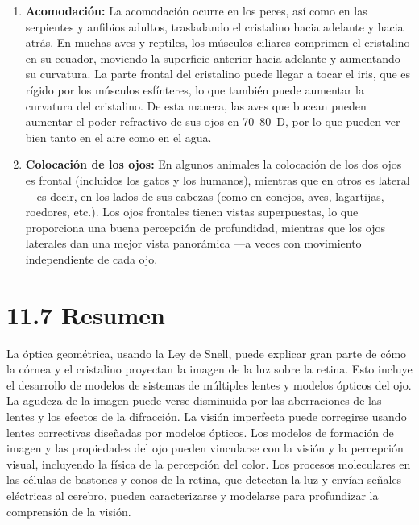 \documentclass[12pt]{book}
\begin{document}
\begin{enumerate}
  \item \textbf{Acomodación:} La acomodación ocurre en los peces, así como en las serpientes y anfibios adultos, trasladando el cristalino hacia adelante y hacia atrás. En muchas aves y reptiles, los músculos ciliares comprimen el cristalino en su ecuador, moviendo la superficie anterior hacia adelante y aumentando su curvatura. La parte frontal del cristalino puede llegar a tocar el iris, que es rígido por los músculos esfínteres, lo que también puede aumentar la curvatura del cristalino. De esta manera, las aves que bucean pueden aumentar el poder refractivo de sus ojos en 70--80~D, por lo que pueden ver bien tanto en el aire como en el agua.

  \item \textbf{Colocación de los ojos:} En algunos animales la colocación de los dos ojos es frontal (incluidos los gatos y los humanos), mientras que en otros es lateral ---es decir, en los lados de sus cabezas (como en conejos, aves, lagartijas, roedores, etc.). Los ojos frontales tienen vistas superpuestas, lo que proporciona una buena percepción de profundidad, mientras que los ojos laterales dan una mejor vista panorámica ---a veces con movimiento independiente de cada ojo.
\end{enumerate}


\section{11.7 Resumen}

La óptica geométrica, usando la Ley de Snell, puede explicar gran parte de cómo la córnea y el cristalino proyectan la imagen de la luz sobre la retina. Esto incluye el desarrollo de modelos de sistemas de múltiples lentes y modelos ópticos del ojo. La agudeza de la imagen puede verse disminuida por las aberraciones de las lentes y los efectos de la difracción. La visión imperfecta puede corregirse usando lentes correctivas diseñadas por modelos ópticos. Los modelos de formación de imagen y las propiedades del ojo pueden vincularse con la visión y la percepción visual, incluyendo la física de la percepción del color. Los procesos moleculares en las células de bastones y conos de la retina, que detectan la luz y envían señales eléctricas al cerebro, pueden caracterizarse y modelarse para profundizar la comprensión de la visión.
\end{document}
